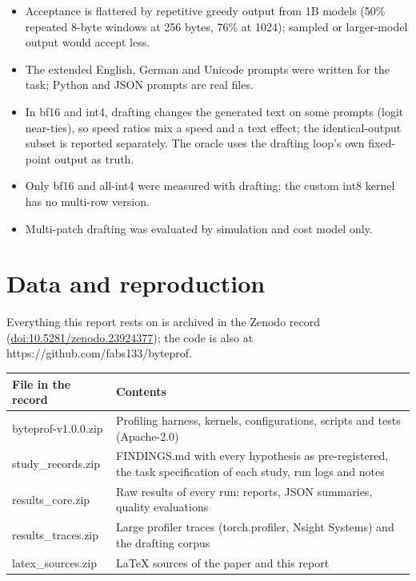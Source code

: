 \documentclass[11pt,a4paper]{article}
\begin{document}
\begin{itemize}
\item
  Acceptance is flattered by repetitive greedy output from 1B models (50\% repeated 8-byte windows at 256 bytes, 76\% at 1024); sampled or larger-model output would accept less.
\item
  The extended English, German and Unicode prompts were written for the task; Python and JSON prompts are real files.
\item
  In bf16 and int4, drafting changes the generated text on some prompts (logit near-ties), so speed ratios mix a speed and a text effect; the identical-output subset is reported separately. The oracle uses the drafting loop's own fixed-point output as truth.
\item
  Only bf16 and all-int4 were measured with drafting; the custom int8 kernel has no multi-row version.
\item
  Multi-patch drafting was evaluated by simulation and cost model only.
\end{itemize}

\section{Data and reproduction}\label{data-and-reproduction}

Everything this report rests on is archived in the Zenodo record (\href{https://doi.org/10.5281/zenodo.23924377}{doi:10.5281/zenodo.23924377}); the code is also at https://github.com/fabs133/byteprof.

\begin{center}\small\setlength{\tabcolsep}{4pt}
\begin{tabular}{@{}>{\raggedright\arraybackslash}p{}>{\raggedright\arraybackslash}p{}@{}}
\toprule
\textbf{File in the record} & \textbf{Contents} \\
\midrule
byteprof-v1.0.0.zip & Profiling harness, kernels, configurations, scripts and tests (Apache-2.0) \\
study\_records.zip & FINDINGS.md with every hypothesis as pre-registered, the task specification of each study, run logs and notes \\
results\_core.zip & Raw results of every run: reports, JSON summaries, quality evaluations \\
results\_traces.zip & Large profiler traces (torch.profiler, Nsight Systems) and the drafting corpus \\
latex\_sources.zip & LaTeX sources of the paper and this report \\
\bottomrule
\end{tabular}
\end{center}
\end{document}
